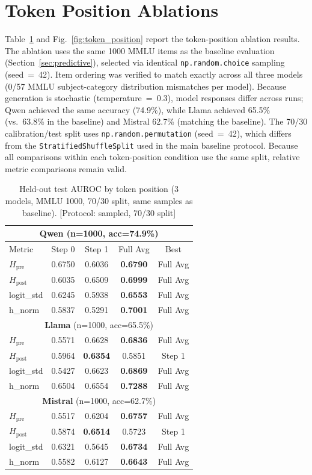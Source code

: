\documentclass{ieeeaccess}
\newcommand{\Hpre}{H_{\text{pre}}}
\newcommand{\Hpost}{H_{\text{post}}}
\begin{document}
\FloatBarrier
\section{Token Position Ablations}
\label{app:token}

Table~\ref{tab:token_full} and Fig.~\ref{fig:token_position} report the token-position ablation results. The ablation uses the same 1000 MMLU items as the baseline evaluation (Section~\ref{sec:predictive}), selected via identical \texttt{np.random.choice} sampling (seed~=~42). Item ordering was verified to match exactly across all three models (0/57 MMLU subject-category distribution mismatches per model). Because generation is stochastic (temperature~=~0.3), model responses differ across runs; Qwen achieved the same accuracy (74.9\%), while Llama achieved 65.5\% (vs.\ 63.8\% in the baseline) and Mistral 62.7\% (matching the baseline). The 70/30 calibration/test split uses \texttt{np.random.permutation} (seed~=~42), which differs from the \texttt{StratifiedShuffleSplit} used in the main baseline protocol. Because all comparisons within each token-position condition use the same split, relative metric comparisons remain valid.

\begin{table}[!ht]
\centering
\caption{Held-out test AUROC by token position (3 models, MMLU 1000, 70/30 split, same samples as baseline). [Protocol: sampled, 70/30 split]}
\label{tab:token_full}
\footnotesize
\setlength{\tabcolsep}{3pt}
\begin{tabular}{l cccc}
\toprule
\multicolumn{5}{c}{\textbf{Qwen} (n=1000, acc=74.9\%)} \\
\midrule
Metric & Step 0 & Step 1 & Full Avg & Best \\
\midrule
$\Hpre$ & 0.6750 & 0.6036 & \textbf{0.6790} & Full Avg \\
$\Hpost$ & 0.6035 & 0.6509 & \textbf{0.6999} & Full Avg \\
logit\_std & 0.6245 & 0.5938 & \textbf{0.6553} & Full Avg \\
h\_norm & 0.5837 & 0.5291 & \textbf{0.7001} & Full Avg \\
\midrule
\multicolumn{5}{c}{\textbf{Llama} (n=1000, acc=65.5\%)} \\
\midrule
$\Hpre$ & 0.5571 & 0.6628 & \textbf{0.6836} & Full Avg \\
$\Hpost$ & 0.5964 & \textbf{0.6354} & 0.5851 & Step 1 \\
logit\_std & 0.5427 & 0.6623 & \textbf{0.6869} & Full Avg \\
h\_norm & 0.6504 & 0.6554 & \textbf{0.7288} & Full Avg \\
\midrule
\multicolumn{5}{c}{\textbf{Mistral} (n=1000, acc=62.7\%)} \\
\midrule
$\Hpre$ & 0.5517 & 0.6204 & \textbf{0.6757} & Full Avg \\
$\Hpost$ & 0.5874 & \textbf{0.6514} & 0.5723 & Step 1 \\
logit\_std & 0.6321 & 0.5645 & \textbf{0.6734} & Full Avg \\
h\_norm & 0.5582 & 0.6127 & \textbf{0.6643} & Full Avg \\
\bottomrule
\end{tabular}
\end{table}
\end{document}
